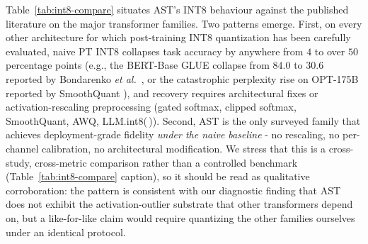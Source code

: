 \documentclass[conference]{IEEEtran}
\begin{document}
Table~\ref{tab:int8-compare} situates AST's INT8 behaviour against the published literature on the major transformer families. Two patterns emerge. First, on every other architecture for which post-training INT8 quantization has been carefully evaluated, naive PT INT8 collapses task accuracy by anywhere from $4$ to over $50$ percentage points (e.g., the BERT-Base GLUE collapse from $84.0$ to $30.6$ reported by Bondarenko \emph{et al.}~\cite{bondarenko2023quantizable}, or the catastrophic perplexity rise on OPT-175B reported by SmoothQuant \cite{xiao2024streaming}), and recovery requires architectural fixes or activation-rescaling preprocessing (gated softmax, clipped softmax, SmoothQuant, AWQ, LLM.int8(\,)). Second, AST is the only surveyed family that achieves deployment-grade fidelity \emph{under the naive baseline} - no rescaling, no per-channel calibration, no architectural modification. We stress that this is a cross-study, cross-metric comparison rather than a controlled benchmark (Table~\ref{tab:int8-compare} caption), so it should be read as qualitative corroboration: the pattern is consistent with our diagnostic finding that AST does not exhibit the activation-outlier substrate that other transformers depend on, but a like-for-like claim would require quantizing the other families ourselves under an identical protocol.
\end{document}
